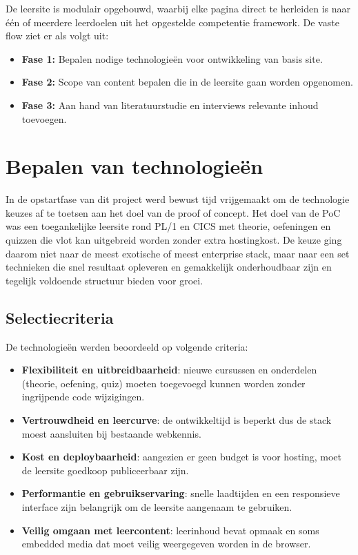 De leersite is modulair opgebouwd, waarbij elke pagina direct te herleiden is naar één of meerdere leerdoelen uit het opgestelde competentie framework. 
De vaste flow ziet er als volgt uit:

\begin{itemize}
    \item \textbf{Fase 1:} Bepalen nodige technologieën voor ontwikkeling van basis site.
    \item \textbf{Fase 2:} Scope van content bepalen die in de leersite gaan worden opgenomen.
    \item \textbf{Fase 3:} Aan hand van literatuurstudie en interviews relevante inhoud toevoegen.
\end{itemize}

\section{Bepalen van technologieën}%
\label{sec:Bepalen-van-technologien}

In de opstartfase van dit project werd bewust tijd vrijgemaakt om de technologie keuzes af te toetsen aan het doel van de proof of concept.
Het doel van de PoC was een toegankelijke leersite rond PL/1 en CICS met theorie, oefeningen en quizzen die vlot kan uitgebreid worden zonder extra hostingkost.
De keuze ging daarom niet naar de meest exotische of meest enterprise stack, maar naar een set technieken die snel resultaat opleveren en gemakkelijk onderhoudbaar zijn en tegelijk voldoende structuur bieden voor groei.

\subsection{Selectiecriteria}%
\label{sec:Selectiecriteria-technologien}
De technologieën werden beoordeeld op volgende criteria:
\begin{itemize}
  \item \textbf{Flexibiliteit en uitbreidbaarheid}: nieuwe cursussen en onderdelen (theorie, oefening, quiz) moeten toegevoegd kunnen worden zonder ingrijpende code wijzigingen.
  \item \textbf{Vertrouwdheid en leercurve}: de ontwikkeltijd is beperkt dus de stack moest aansluiten bij bestaande webkennis.
  \item \textbf{Kost en deploybaarheid}: aangezien er geen budget is voor hosting, moet de leersite goedkoop publiceerbaar zijn.
  \item \textbf{Performantie en gebruikservaring}: snelle laadtijden en een responsieve interface zijn belangrijk om de leersite aangenaam te gebruiken.
  \item \textbf{Veilig omgaan met leercontent}: leerinhoud bevat opmaak en soms embedded media dat moet veilig weergegeven worden in de browser.
\end{itemize}

